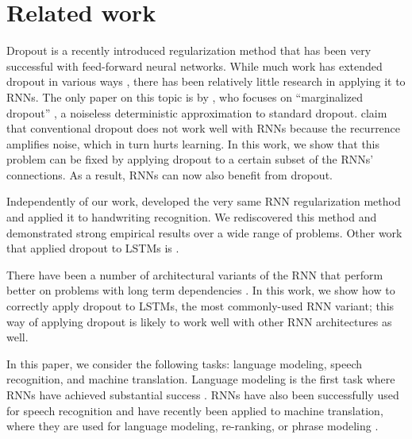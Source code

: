 \documentclass{article}
\begin{document}
\section{Related work}

Dropout \cite{srivastava2013improving} is a recently introduced
regularization method that has been very successful with
feed-forward neural networks.   While much work has extended dropout in  
various ways \cite{wang2013fast,wan2013regularization}, there has
been relatively little research in applying it to RNNs. The only
paper on this topic is by \citet{bayer2013fast}, who focuses on
``marginalized dropout'' \cite{wang2013fast}, a
noiseless deterministic approximation to standard dropout.
\citet{bayer2013fast} claim that conventional dropout does not work well
with RNNs because the recurrence amplifies noise, which in turn hurts learning. 
In this work, we show that this problem can be fixed by
applying dropout to a certain subset of the RNNs' connections.  As a result, RNNs
can now also benefit from dropout.



Independently of our work, \cite{pham2013dropout} developed the very same RNN 
regularization method and applied it to handwriting recognition.  We rediscovered
this method and demonstrated strong empirical results over a wide range of problems. 
Other work that applied dropout to LSTMs is \cite{pachitariu2013regularization}.

There have been a number of architectural variants of the RNN that
perform better on problems with long term dependencies
\cite{hochreiter1997long, graves2009novel, cho2014learning,
  jaeger2007optimization, koutnik2014clockwork, sundermeyer2012lstm}.  In this work, we
show how to correctly apply dropout to LSTMs, the most
commonly-used RNN variant; this way of applying dropout is likely to
work well with other RNN architectures as well. 

In this paper, we consider the following tasks: language modeling,
speech recognition, and machine translation.  Language modeling is the
first task where RNNs have achieved substantial success
\cite{mikolov2010recurrent, mikolov2011strategies,
  pascanu2013construct}.  RNNs have also been successfully used for
speech recognition \cite{robinson1996use, graves2013speech} and have
recently been applied to machine translation, where they are 
used for language modeling, re-ranking, or phrase modeling
\cite{devlin14,kal13,cho2014learning,chow1987byblos,mikolov2013exploiting}.
\end{document}
